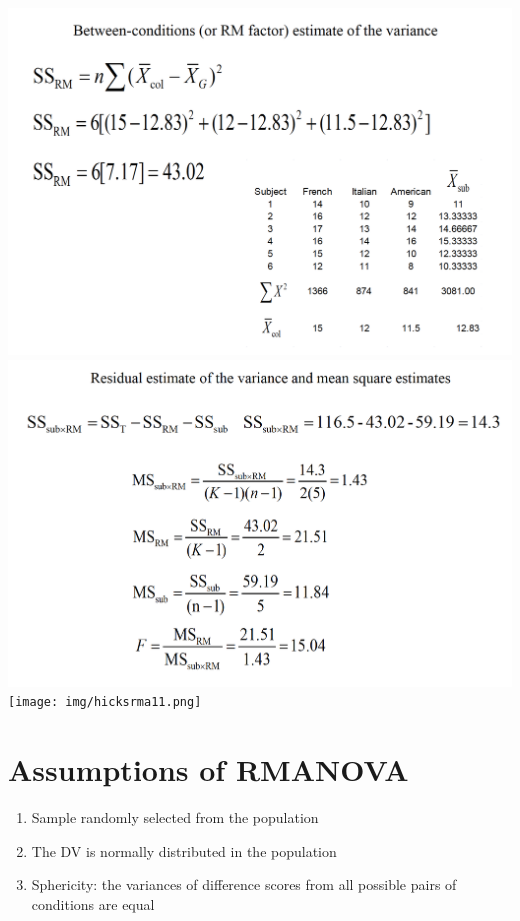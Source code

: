 \documentclass[]{book}
\providecommand{\tightlist}{%
  \setlength{\itemsep}{0pt}\setlength{\parskip}{0pt}}
\theoremstyle{definition}
\theoremstyle{definition}
\theoremstyle{definition}
\theoremstyle{remark}
\begin{document}
\includegraphics{img/hicksrma9.png} \includegraphics{img/hicksrma10.png}
\texttt{[image: img/hicksrma11.png]}

\section{Assumptions of RMANOVA}\label{assumptions-of-rmanova}

\begin{enumerate}
\def\labelenumi{\arabic{enumi}.}
\tightlist
\item
  Sample randomly selected from the population
\item
  The DV is normally distributed in the population
\item
  Sphericity: the variances of difference scores from all possible pairs
  of conditions are equal
\end{enumerate}
\end{document}
